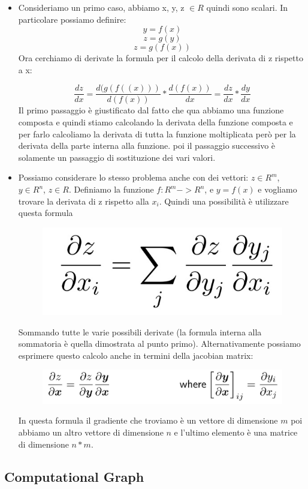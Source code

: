 \documentclass[14pt]{extreport}
\begin{document}
\begin{itemize}
\item Consideriamo un primo caso, abbiamo x, y, z $\in R$ quindi sono scalari. In particolare possiamo definire:
$$y = f(x)$$
$$z = g(y)$$
$$z = g(f(x))$$ Ora cerchiamo di derivate la formula per il calcolo della derivata di z rispetto a x:

$$\frac{dz}{dx}=\frac{d(g(f((x)))}{d(f(x))}*\frac{d(f(x))}{dx} = \frac{dz}{dx}*\frac{dy}{dx}$$ Il primo passaggio è giustificato dal fatto che qua
abbiamo una funzione composta e quindi stiamo calcolando la derivata della funzione composta e per farlo calcoliamo la derivata di tutta la funzione
moltiplicata però per la derivata della parte interna alla funzione. poi il passaggio successivo è solamente un passaggio di sostituzione dei vari
valori.
\item Possiamo considerare lo stesso problema anche con dei vettori: $z \in R^m$, $y \in R^n$, $z \in R$. Definiamo la funzione $f:R^m -> R^n$, e $y =
f(x)$ e vogliamo trovare la derivata di z rispetto alla $x_i$. Quindi una possibilità è utilizzare questa formula \begin{figure}[H]
\centering
\includegraphics[width=0.7\linewidth]{382.jpeg}
\end{figure}
Sommando tutte le varie possibili derivate (la formula interna alla sommatoria è quella dimostrata al punto primo). Alternativamente possiamo
esprimere questo calcolo anche in termini della jacobian matrix:
\begin{figure}[H]
\centering
\includegraphics[width=0.7\linewidth]{383.jpeg}
\end{figure}
In questa formula il gradiente che troviamo è un vettore di dimensione $m$ poi abbiamo un altro vettore di dimensione $n$ e l'ultimo elemento è una
matrice di dimensione $n*m$.
\end{itemize}


\subsection{Computational Graph}
\end{document}

